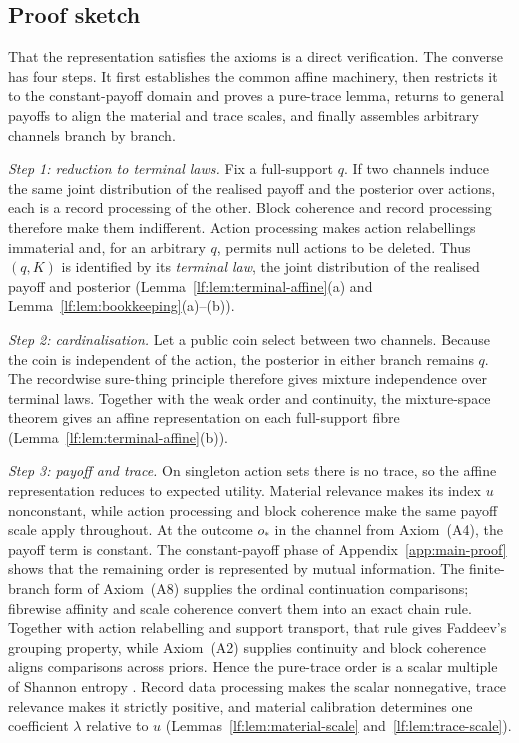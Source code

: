 \documentclass[11pt,a4paper]{article}
\theoremstyle{definition}
\newcommand{\1}{\mathbf 1}
\begin{document}
\subsection{Proof sketch}
That the representation satisfies the axioms is a direct verification.  The converse has four steps.  It first establishes the common affine
machinery, then restricts it to the constant-payoff domain and proves a pure-trace lemma, returns to general
payoffs to align the material and trace scales, and finally assembles arbitrary channels branch by branch.

\emph{Step 1: reduction to terminal laws.}  Fix a full-support $q$.  If two channels induce the same joint
distribution of the realised payoff and the posterior over actions, each is a record processing of the other.
Block coherence and record processing therefore make them indifferent.  Action processing makes action
relabellings immaterial and, for an arbitrary $q$, permits null actions to be deleted.  Thus $(q,K)$ is identified
by its \emph{terminal law}, the joint distribution of the realised payoff and posterior
(Lemma~\ref{lf:lem:terminal-affine}\textup{(a)} and
Lemma~\ref{lf:lem:bookkeeping}\textup{(a)--(b)}).

\emph{Step 2: cardinalisation.}  Let a public coin select between two channels.  Because the coin is independent
of the action, the posterior in either branch remains $q$.  The recordwise sure-thing principle therefore gives
mixture independence over terminal laws.  Together with the weak order and continuity, the mixture-space theorem
gives an affine representation on each full-support fibre (Lemma~\ref{lf:lem:terminal-affine}\textup{(b)}).

\emph{Step 3: payoff and trace.}  On singleton action sets there is no trace, so the affine representation reduces
to expected utility.  Material relevance makes its index $u$ nonconstant, while action processing and block
coherence make the same payoff scale apply throughout.  At the outcome $o_\ast$ in the channel from Axiom~\textup{(A4)},
the payoff term is constant.  The constant-payoff phase of Appendix~\ref{app:main-proof} shows that the remaining order is represented by
mutual information.  The finite-branch form of Axiom~\textup{(A8)} supplies the ordinal continuation comparisons;
fibrewise affinity and scale coherence
convert them into an exact chain rule.  Together with action relabelling and support transport, that rule gives
Faddeev's grouping property, while Axiom~\textup{(A2)} supplies continuity and block coherence aligns comparisons
across priors.  Hence the pure-trace order is a scalar multiple of Shannon entropy \cite{Faddeev1956}.
Record data processing makes the scalar nonnegative, trace relevance makes it strictly positive, and material
calibration determines one coefficient $\lambda$ relative to $u$
(Lemmas~\ref{lf:lem:material-scale} and~\ref{lf:lem:trace-scale}).
\end{document}
